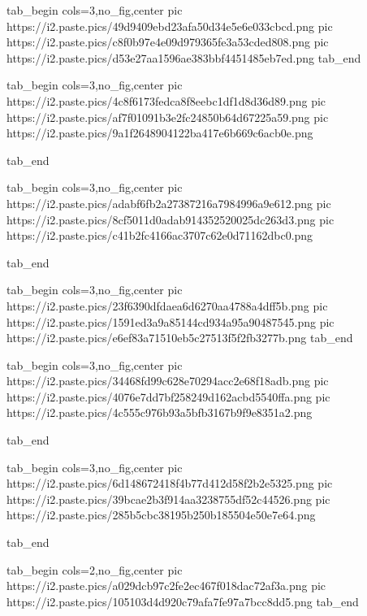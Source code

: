 
 
 
 
 
\zzSecCmtScr

\ifcmt
  tab_begin cols=3,no_fig,center
     pic https://i2.paste.pics/49d9409ebd23afa50d34e5e6e033cbcd.png
		 pic https://i2.paste.pics/c8f0b97e4e09d979365fe3a53cded808.png
		 pic https://i2.paste.pics/d53e27aa1596ae383bbf4451485eb7ed.png
  tab_end
\fi

\ifcmt
  tab_begin cols=3,no_fig,center
	pic https://i2.paste.pics/4c8f6173fedca8f8eebc1df1d8d36d89.png
	pic https://i2.paste.pics/af7f01091b3e2fc24850b64d67225a59.png
	pic https://i2.paste.pics/9a1f2648904122ba417e6b669c6acb0e.png

  tab_end
\fi

\ifcmt
  tab_begin cols=3,no_fig,center
	pic https://i2.paste.pics/adabf6fb2a27387216a7984996a9e612.png
	pic https://i2.paste.pics/8cf5011d0adab914352520025dc263d3.png
	pic https://i2.paste.pics/c41b2fc4166ac3707c62e0d71162dbc0.png

  tab_end
\fi

\ifcmt
  tab_begin cols=3,no_fig,center
		pic https://i2.paste.pics/23f6390dfdaea6d6270aa4788a4dff5b.png
		pic https://i2.paste.pics/1591ed3a9a85144cd934a95a90487545.png
		pic https://i2.paste.pics/e6ef83a71510eb5c27513f5f2fb3277b.png
  tab_end
\fi

\ifcmt
  tab_begin cols=3,no_fig,center
		pic https://i2.paste.pics/34468fd99c628e70294acc2e68f18adb.png
		pic https://i2.paste.pics/4076e7dd7bf258249d162acbd5540ffa.png
		pic https://i2.paste.pics/4c555c976b93a5bfb3167b9f9e8351a2.png

  tab_end
\fi

\ifcmt
  tab_begin cols=3,no_fig,center
		pic https://i2.paste.pics/6d148672418f4b77d412d58f2b2e5325.png
		pic https://i2.paste.pics/39bcae2b3f914aa3238755df52c44526.png
		pic https://i2.paste.pics/285b5cbc38195b250b185504e50e7e64.png

  tab_end
\fi

\ifcmt
  tab_begin cols=2,no_fig,center
		pic https://i2.paste.pics/a029dcb97c2fe2ec467f018dac72af3a.png
		pic https://i2.paste.pics/105103d4d920c79afa7fe97a7bcc8dd5.png
  tab_end
\fi

